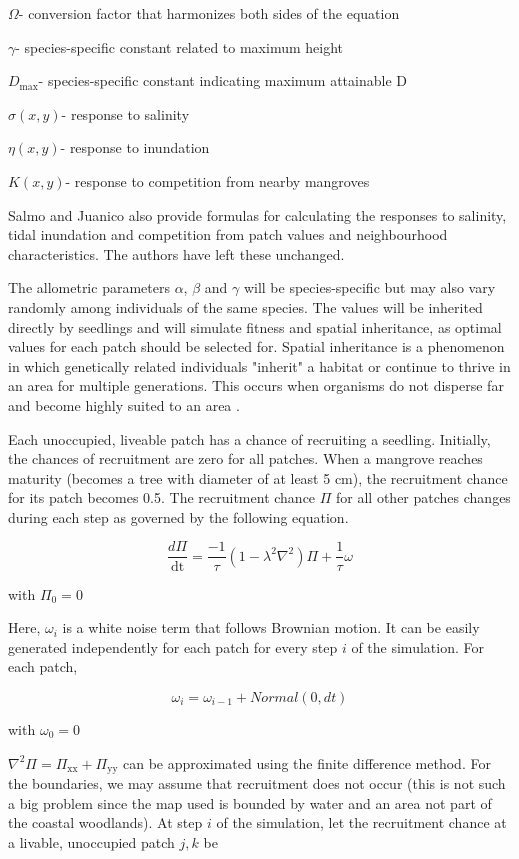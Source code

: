 \(\Omega\)- conversion factor that harmonizes both sides of the equation

\(\gamma\)- species-specific constant related to maximum height

\(D_{\max}\)- species-specific constant indicating maximum attainable D

\(\sigma(x,y)\)- response to salinity

\(\eta(x,y)\)- response to inundation

\(K(x,y)\)- response to competition from nearby mangroves

Salmo and Juanico also provide formulas for calculating the responses to
salinity, tidal inundation and competition from patch values and
neighbourhood characteristics. The authors have left these unchanged.

The allometric parameters \(\alpha\), \(\beta\) and \(\gamma\) will be
species-specific but may also vary randomly among individuals of the
same species. The values will be inherited directly by seedlings and
will simulate fitness and spatial inheritance, as optimal values for
each patch should be selected for. Spatial inheritance is a phenomenon
in which genetically related individuals "inherit" a habitat or
continue to thrive in an area for multiple generations. This occurs when
organisms do not disperse far and become highly suited to an area \cite{Schauber2007}.

Each unoccupied, liveable patch has a chance of recruiting a seedling.
Initially, the chances of recruitment are zero for all patches. When a
mangrove reaches maturity (becomes a tree with diameter of at least 5
cm), the recruitment chance for its patch becomes 0.5. The recruitment
chance \(\Pi\) for all other patches changes during each step as governed 
by the following equation.

$$\frac{d\Pi}{\text{dt}} = \frac{- 1}{\tau}(1 - \lambda^{2}\nabla^{2})\Pi + \frac{1}{\tau}\omega$$

with $\Pi_{0} = 0$

Here, $\omega_{i}$ is a white noise term that follows Brownian motion.
It can be easily generated independently for each patch for every
step \(i\) of the simulation. For each patch,

$$\omega_{i} = \omega_{i - 1} + Normal(0,dt)$$

with $\omega_{0} = 0$


$\nabla^{2}\Pi = \Pi_{\text{xx}} + \Pi_{\text{yy}}$ can be approximated
using the finite difference method. For the boundaries, we may assume
that recruitment does not occur (this is not such a big problem since
the map used is bounded by water and an area not part of the coastal
woodlands). At step \(i\) of the simulation, let the recruitment chance
at a livable, unoccupied patch \(j,k\) be

